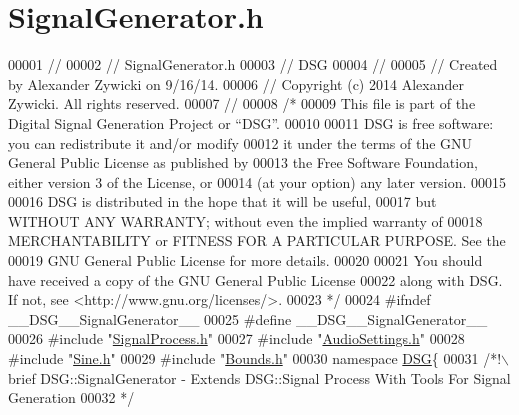 \hypertarget{_signal_generator_8h_source}{\section{Signal\+Generator.\+h}
\label{_signal_generator_8h_source}
}

\begin{DoxyCode}
00001 \textcolor{comment}{//}
00002 \textcolor{comment}{//  SignalGenerator.h}
00003 \textcolor{comment}{//  DSG}
00004 \textcolor{comment}{//}
00005 \textcolor{comment}{//  Created by Alexander Zywicki on 9/16/14.}
00006 \textcolor{comment}{//  Copyright (c) 2014 Alexander Zywicki. All rights reserved.}
00007 \textcolor{comment}{//}
00008 \textcolor{comment}{/*}
00009 \textcolor{comment}{ This file is part of the Digital Signal Generation Project or “DSG”.}
00010 \textcolor{comment}{}
00011 \textcolor{comment}{ DSG is free software: you can redistribute it and/or modify}
00012 \textcolor{comment}{ it under the terms of the GNU General Public License as published by}
00013 \textcolor{comment}{ the Free Software Foundation, either version 3 of the License, or}
00014 \textcolor{comment}{ (at your option) any later version.}
00015 \textcolor{comment}{}
00016 \textcolor{comment}{ DSG is distributed in the hope that it will be useful,}
00017 \textcolor{comment}{ but WITHOUT ANY WARRANTY; without even the implied warranty of}
00018 \textcolor{comment}{ MERCHANTABILITY or FITNESS FOR A PARTICULAR PURPOSE.  See the}
00019 \textcolor{comment}{ GNU General Public License for more details.}
00020 \textcolor{comment}{}
00021 \textcolor{comment}{ You should have received a copy of the GNU General Public License}
00022 \textcolor{comment}{ along with DSG.  If not, see <http://www.gnu.org/licenses/>.}
00023 \textcolor{comment}{ */}
00024 \textcolor{preprocessor}{#ifndef \_\_DSG\_\_SignalGenerator\_\_}
00025 \textcolor{preprocessor}{#define \_\_DSG\_\_SignalGenerator\_\_}
00026 \textcolor{preprocessor}{#include "\hyperlink{_signal_process_8h}{SignalProcess.h}"}
00027 \textcolor{preprocessor}{#include "\hyperlink{_audio_settings_8h}{AudioSettings.h}"}
00028 \textcolor{preprocessor}{#include "\hyperlink{_sine_8h}{Sine.h}"}
00029 \textcolor{preprocessor}{#include "\hyperlink{_bounds_8h}{Bounds.h}"}
00030 \textcolor{keyword}{namespace }\hyperlink{namespace_d_s_g}{DSG}\{\textcolor{comment}{}
00031 \textcolor{comment}{    /*!\(\backslash\)brief DSG::SignalGenerator - Extends DSG::Signal Process With Tools For Signal Generation}
00032 \textcolor{comment}{     */}

\end{DoxyCode}
